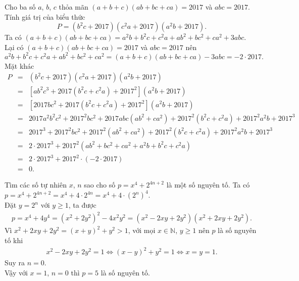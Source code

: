 \begin{bt}%
 Cho ba số $a$, $b$, $c$ thỏa mãn $(a+b+c)(ab+bc+ca)=2017$ và $abc=2017$. Tính giá trị của biểu thức $$P = (b^2c+2017)(c^2a+2017)(a^2b+2017).$$
 \loigiai
  {
  Ta có $(a+b+c)(ab+bc+ca)=a^2b+b^2c+c^2a+ab^2+bc^2+ca^2+3abc$.\\
  Lại có $(a+b+c)(ab+bc+ca)=2017$ và $abc=2017$ nên
  $$a^2b+b^2c+c^2a+ab^2+bc^2+ca^2 = (a+b+c)(ab+bc+ca) - 3abc = -2 \cdot 2017.$$
  Mặt khác
  \allowdisplaybreaks
  \begin{eqnarray*}
   P &=& (b^2c+2017)(c^2a+2017)(a^2b+2017)\\
   &=& \left[ab^2c^3 + 2017(b^2c+c^2a) + 2017^2\right](a^2b+2017)\\
   &=& \left[2017bc^2+2017(b^2c+c^2a)+2017^2\right](a^2b+2017)\\
   &=& 2017a^2b^2c^2 + 2017^2bc^2 + 2017abc(ab^2+ca^2) + 2017^2(b^2c+c^2a) +2017^2a^2b + 2017^3\\
   &=& 2017^3+2017^2bc^2 + 2017^2(ab^2+ca^2) + 2017^2(b^2c+c^2a) + 2017^2a^2b + 2017^3\\
   &=& 2 \cdot 2017^3 + 2017^2(ab^2+bc^2+ca^2+a^2b+b^2c+c^2a)\\
   &=& 2 \cdot 2017^3 + 2017^2 \cdot \left(-2\cdot 2017\right)\\
   &=& 0.
  \end{eqnarray*}
  }
\end{bt}

\begin{bt}%
 Tìm các số tự nhiên $x$, $n$ sao cho số $p = x^4+2^{4n+2}$ là một số nguyên tố.
 \loigiai
  {
  Ta có $p = x^4+2^{4n+2} = x^4 + 4 \cdot 2^{4n} = x^4 + 4\cdot \left(2^n\right)^4$.\\
  Đặt $y=2^n$ với $y \geq 1$, ta được 
  \begin{eqnarray*}
   p = x^4+4y^4 = (x^2+2y^2)^2-4x^2y^2 = (x^2-2xy+2y^2)(x^2+2xy+2y^2).
  \end{eqnarray*}
  Vì $x^2+2xy+2y^2 = (x+y)^2+y^2>1$, với mọi $x\in\mathbb{N}$, $y\geq 1$ nên $p$ là số nguyên tố khi
  \begin{eqnarray*}
   x^2-2xy+2y^2=1 \Leftrightarrow (x-y)^2+y^2=1 \Leftrightarrow x=y=1.
  \end{eqnarray*}
  Suy ra $n=0$.\\
  Vậy với $x=1$, $n=0$ thì $p=5$ là số nguyên tố.
  }
\end{bt}


